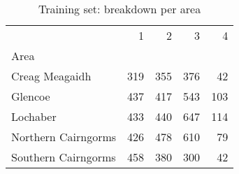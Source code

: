 \begin{table}[h]
\caption{Training set:  breakdown per area}
\label{tbl:sais_mapped_hazard_breakdown_per_area_train}
\begin{tabular}{lrrrr}
\toprule
 & 1 & 2 & 3 & 4 \\
Area &  &  &  &  \\
\midrule
Creag Meagaidh & 319 & 355 & 376 & 42 \\
Glencoe & 437 & 417 & 543 & 103 \\
Lochaber & 433 & 440 & 647 & 114 \\
Northern Cairngorms & 426 & 478 & 610 & 79 \\
Southern Cairngorms & 458 & 380 & 300 & 42 \\
\bottomrule
\end{tabular}
\end{table}

